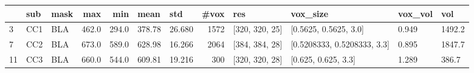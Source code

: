 \begin{tabular}{lllrrllrllll}
\toprule
{} &  sub & mask &    max &    min &    mean &     std &  \#vox &             res &                     vox\_size & vox\_vol &     vol \\
\midrule
3  &  CC1 &  BLA &  462.0 &  294.0 &  378.78 &  26.680 &  1572 &  [320, 320, 25] &        [0.5625, 0.5625, 3.0] &   0.949 &  1492.2 \\
7  &  CC2 &  BLA &  673.0 &  589.0 &  628.98 &  16.266 &  2064 &  [384, 384, 28] &  [0.5208333, 0.5208333, 3.3] &   0.895 &  1847.7 \\
11 &  CC3 &  BLA &  660.0 &  544.0 &  609.81 &  19.216 &   300 &  [320, 320, 28] &          [0.625, 0.625, 3.3] &   1.289 &   386.7 \\
\bottomrule
\end{tabular}
